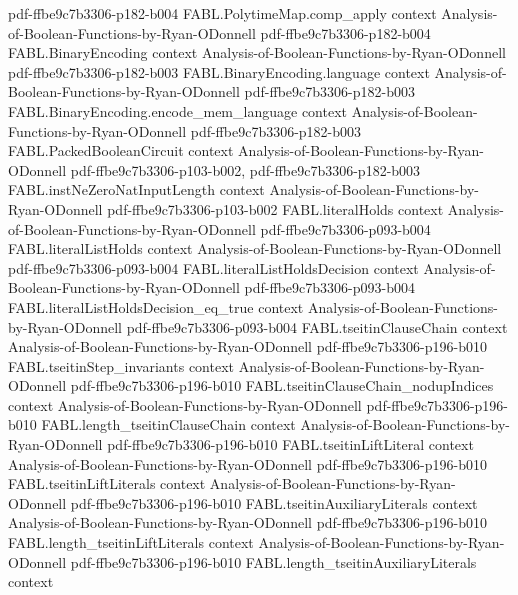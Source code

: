 \begin{theorem}
  {pdf-ffbe9c7b3306-p182-b004}
\proofstep
  {FABL.PolytimeMap.comp_apply}
  {context}
  {Analysis-of-Boolean-Functions-by-Ryan-ODonnell}
  {pdf-ffbe9c7b3306-p182-b004}
\proofstep
  {FABL.BinaryEncoding}
  {context}
  {Analysis-of-Boolean-Functions-by-Ryan-ODonnell}
  {pdf-ffbe9c7b3306-p182-b003}
\proofstep
  {FABL.BinaryEncoding.language}
  {context}
  {Analysis-of-Boolean-Functions-by-Ryan-ODonnell}
  {pdf-ffbe9c7b3306-p182-b003}
\proofstep
  {FABL.BinaryEncoding.encode_mem_language}
  {context}
  {Analysis-of-Boolean-Functions-by-Ryan-ODonnell}
  {pdf-ffbe9c7b3306-p182-b003}
\proofstep
  {FABL.PackedBooleanCircuit}
  {context}
  {Analysis-of-Boolean-Functions-by-Ryan-ODonnell}
  {pdf-ffbe9c7b3306-p103-b002,
    pdf-ffbe9c7b3306-p182-b003}
\proofstep
  {FABL.instNeZeroNatInputLength}
  {context}
  {Analysis-of-Boolean-Functions-by-Ryan-ODonnell}
  {pdf-ffbe9c7b3306-p103-b002}
\proofstep
  {FABL.literalHolds}
  {context}
  {Analysis-of-Boolean-Functions-by-Ryan-ODonnell}
  {pdf-ffbe9c7b3306-p093-b004}
\proofstep
  {FABL.literalListHolds}
  {context}
  {Analysis-of-Boolean-Functions-by-Ryan-ODonnell}
  {pdf-ffbe9c7b3306-p093-b004}
\proofstep
  {FABL.literalListHoldsDecision}
  {context}
  {Analysis-of-Boolean-Functions-by-Ryan-ODonnell}
  {pdf-ffbe9c7b3306-p093-b004}
\proofstep
  {FABL.literalListHoldsDecision_eq_true}
  {context}
  {Analysis-of-Boolean-Functions-by-Ryan-ODonnell}
  {pdf-ffbe9c7b3306-p093-b004}
\proofstep
  {FABL.tseitinClauseChain}
  {context}
  {Analysis-of-Boolean-Functions-by-Ryan-ODonnell}
  {pdf-ffbe9c7b3306-p196-b010}
\proofstep
  {FABL.tseitinStep_invariants}
  {context}
  {Analysis-of-Boolean-Functions-by-Ryan-ODonnell}
  {pdf-ffbe9c7b3306-p196-b010}
\proofstep
  {FABL.tseitinClauseChain_nodupIndices}
  {context}
  {Analysis-of-Boolean-Functions-by-Ryan-ODonnell}
  {pdf-ffbe9c7b3306-p196-b010}
\proofstep
  {FABL.length_tseitinClauseChain}
  {context}
  {Analysis-of-Boolean-Functions-by-Ryan-ODonnell}
  {pdf-ffbe9c7b3306-p196-b010}
\proofstep
  {FABL.tseitinLiftLiteral}
  {context}
  {Analysis-of-Boolean-Functions-by-Ryan-ODonnell}
  {pdf-ffbe9c7b3306-p196-b010}
\proofstep
  {FABL.tseitinLiftLiterals}
  {context}
  {Analysis-of-Boolean-Functions-by-Ryan-ODonnell}
  {pdf-ffbe9c7b3306-p196-b010}
\proofstep
  {FABL.tseitinAuxiliaryLiterals}
  {context}
  {Analysis-of-Boolean-Functions-by-Ryan-ODonnell}
  {pdf-ffbe9c7b3306-p196-b010}
\proofstep
  {FABL.length_tseitinLiftLiterals}
  {context}
  {Analysis-of-Boolean-Functions-by-Ryan-ODonnell}
  {pdf-ffbe9c7b3306-p196-b010}
\proofstep
  {FABL.length_tseitinAuxiliaryLiterals}
  {context}

\end{theorem}
